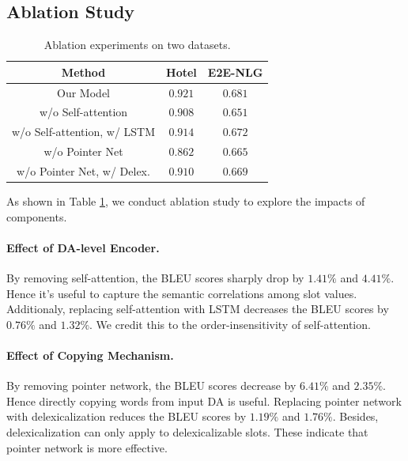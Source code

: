 \documentclass[letterpaper]{article} %
\begin{document}
\subsection{Ablation Study}

	\begin{table}[t]
		\centering

		\begin{tabular}{c|cc}
			\hline

			Method & Hotel & E2E-NLG  \\

			\hline
			Our Model & $\mathbf{0.921}$ & $\mathbf{0.681}$ \\

			\hline
			w/o Self-attention & $0.908$ & $0.651$  \\

			w/o Self-attention, w/ LSTM & $0.914$ & $0.672$ \\

			\cdashline{1-3}
			w/o Pointer Net & $0.862$ & $0.665$ \\
			w/o Pointer Net, w/ Delex. & $0.910$ & $0.669$ \\

			\hline
		\end{tabular}
		\caption{Ablation experiments on two datasets.}

		\label{tab:Ablation Study}
	\end{table}

	As shown in Table \ref{tab:Ablation Study}, we conduct ablation study to explore the impacts of components.

	\paragraph{Effect of DA-level Encoder.} By removing self-attention, the BLEU scores sharply drop by $1.41\%$ and $4.41\%$. Hence it's useful to capture the semantic correlations among slot values. Additionaly, replacing self-attention with LSTM decreases the BLEU scores by $0.76\%$ and $1.32\%$. We credit this to the order-insensitivity of self-attention.

	\paragraph{Effect of Copying Mechanism.} By removing pointer network, the BLEU scores decrease by $6.41\%$ and $2.35\%$. Hence directly copying words from input DA is useful. Replacing pointer network with delexicalization reduces the BLEU scores by $1.19\%$ and $1.76\%$. Besides, delexicalization can only apply to delexicalizable slots. These indicate that pointer network is more effective.
\end{document}
